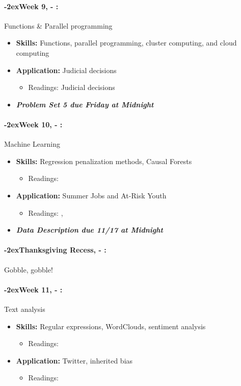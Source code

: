 \documentclass[11pt]{article}
\newcommand{\week}[1]{%
  \paragraph*{\kern-2ex\quad #1, \AdvanceDate[1]\syldate{\today} - \AdvanceDate[2]\syldate{\today}:}%
  \ifdim\wd1=\wd\MONDAY
    \AdvanceDate[7]
  \else
    \AdvanceDate[7]
  \fi%
}
\begin{document}
\week{Week 9} Functions \& Parallel programming
\begin{itemize}
  \item \textbf{Skills:} Functions, parallel programming, cluster computing, and cloud computing
  \item \textbf{Application:} Judicial decisions
  \begin{itemize}
    \item Readings: Judicial decisions
  \end{itemize}
  \item \textit{\textbf{Problem Set 5 due Friday at Midnight}}
\end{itemize}
\week{Week 10} Machine Learning 
\begin{itemize}
  \item \textbf{Skills:} Regression penalization methods, Causal Forests
  \begin{itemize}
    \item Readings: \cite{athey2019machine}
  \end{itemize}
  \item \textbf{Application:} Summer Jobs and At-Risk Youth
  \begin{itemize}
    \item Readings: , \cite{naik2014streetscore}
  \end{itemize}
  \item \textit{\textbf{Data Description due 11/17 at Midnight}}
\end{itemize}
\week{Thanksgiving Recess} Gobble, gobble! 
\week{Week 11} Text analysis
\begin{itemize}
  \item \textbf{Skills:} Regular expressions, WordClouds, sentiment analysis
  \begin{itemize}
    \item Readings:\cite{gentzkow2019text}
  \end{itemize}
  \item \textbf{Application:} Twitter, inherited bias
  \begin{itemize}
    \item Readings: 
  \end{itemize}
\end{itemize}
\end{document}
